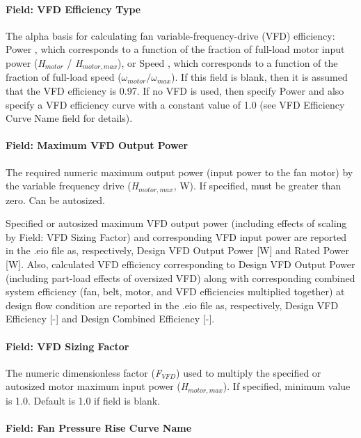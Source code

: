 \paragraph{Field: VFD Efficiency Type}\label{field-vfd-efficiency-type}

The alpha basis for calculating fan variable-frequency-drive (VFD) efficiency: Power , which corresponds to a function of the fraction of full-load motor input power (\emph{H\(_{motor}\)} / \emph{H\(_{motor,max}\)}), or Speed , which corresponds to a function of the fraction of full-load speed (\(\omega_{motor} / \omega_{max}\)). If this field is blank, then it is assumed that the VFD efficiency is 0.97. If no VFD is used, then specify Power and also specify a VFD efficiency curve with a constant value of 1.0 (see VFD Efficiency Curve Name field for details).

\paragraph{Field: Maximum VFD Output Power}\label{field-maximum-vfd-output-power}

The required numeric maximum output power (input power to the fan motor) by the variable frequency drive (\emph{H\(_{motor,max}\)}, W). If specified, must be greater than zero. Can be autosized.

Specified or autosized maximum VFD output power (including effects of scaling by Field: VFD Sizing Factor) and corresponding VFD input power are reported in the .eio file as, respectively, Design VFD Output Power {[}W{]} and Rated Power {[}W{]}. Also, calculated VFD efficiency corresponding to Design VFD Output Power (including part-load effects of oversized VFD) along with corresponding combined system efficiency (fan, belt, motor, and VFD efficiencies multiplied together) at design flow condition are reported in the .eio file as, respectively, Design VFD Efficiency {[}-{]} and Design Combined Efficiency {[}-{]}.

\paragraph{Field: VFD Sizing Factor}\label{field-vfd-sizing-factor}

The numeric dimensionless factor (\emph{F\(_{VFD}\)}) used to multiply the specified or autosized motor maximum input power (\emph{H\(_{motor,max}\)}). If specified, minimum value is 1.0. Default is 1.0 if field is blank.

\paragraph{Field: Fan Pressure Rise Curve Name}\label{field-fan-pressure-rise-curve-name}

